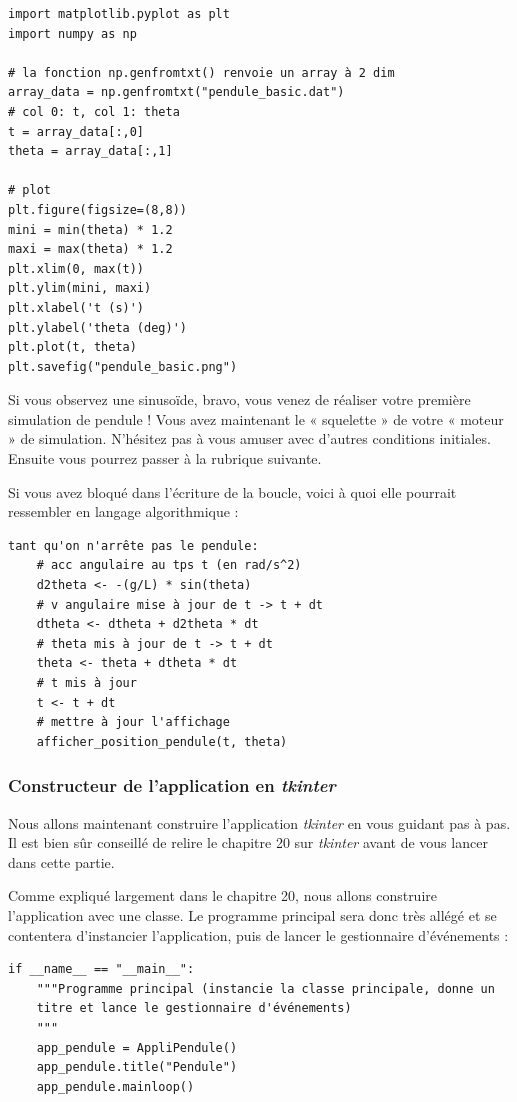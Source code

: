 \documentclass[a4paper,11pt,twoside]{book}
\begin{document}
\begin{verbatim}
import matplotlib.pyplot as plt
import numpy as np

# la fonction np.genfromtxt() renvoie un array à 2 dim
array_data = np.genfromtxt("pendule_basic.dat")
# col 0: t, col 1: theta
t = array_data[:,0]
theta = array_data[:,1]

# plot
plt.figure(figsize=(8,8))
mini = min(theta) * 1.2
maxi = max(theta) * 1.2
plt.xlim(0, max(t))
plt.ylim(mini, maxi)
plt.xlabel('t (s)')
plt.ylabel('theta (deg)')
plt.plot(t, theta)
plt.savefig("pendule_basic.png")
\end{verbatim}

Si vous observez une sinusoïde, bravo, vous venez de réaliser votre
première simulation de pendule ! Vous avez maintenant le « squelette »
de votre « moteur » de simulation. N'hésitez pas à vous amuser avec
d'autres conditions initiales. Ensuite vous pourrez passer à la rubrique
suivante.

Si vous avez bloqué dans l'écriture de la boucle, voici à quoi elle
pourrait ressembler en langage algorithmique :

\begin{verbatim}
tant qu'on n'arrête pas le pendule:
    # acc angulaire au tps t (en rad/s^2)
    d2theta <- -(g/L) * sin(theta)
    # v angulaire mise à jour de t -> t + dt
    dtheta <- dtheta + d2theta * dt
    # theta mis à jour de t -> t + dt
    theta <- theta + dtheta * dt
    # t mis à jour
    t <- t + dt
    # mettre à jour l'affichage
    afficher_position_pendule(t, theta)
\end{verbatim}

\subsubsection{\texorpdfstring{Constructeur de l'application en
\emph{tkinter}}{Constructeur de l'application en tkinter}}\label{constructeur-de-lapplication-en-tkinter}

Nous allons maintenant construire l'application \emph{tkinter} en vous
guidant pas à pas. Il est bien sûr conseillé de relire le chapitre 20
sur \emph{tkinter} avant de vous lancer dans cette partie.

Comme expliqué largement dans le chapitre 20, nous allons construire
l'application avec une classe. Le programme principal sera donc très
allégé et se contentera d'instancier l'application, puis de lancer le
gestionnaire d'événements :

\begin{verbatim}
if __name__ == "__main__":
    """Programme principal (instancie la classe principale, donne un
    titre et lance le gestionnaire d'événements)
    """
    app_pendule = AppliPendule()
    app_pendule.title("Pendule")
    app_pendule.mainloop()
\end{verbatim}
\end{document}
